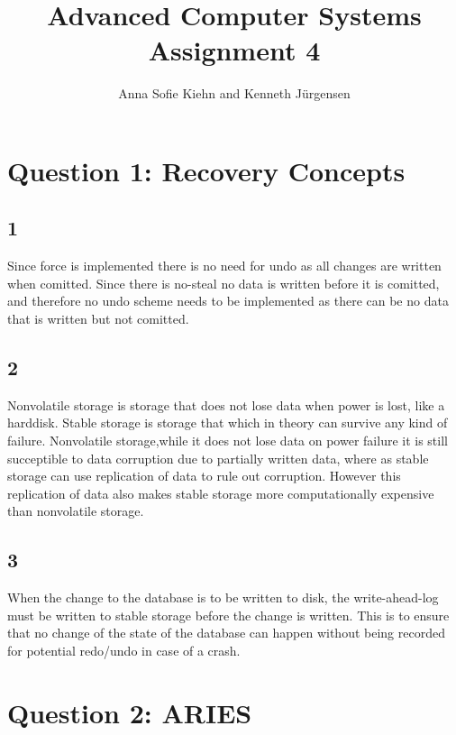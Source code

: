 \documentclass{article}
\theoremstyle{plain}
\theoremstyle{nonumberplain}
\begin{document}
\title{Advanced Computer Systems \\ Assignment 4}

\author{Anna Sofie Kiehn and Kenneth Jürgensen}

\maketitle

\section*{Question 1: Recovery Concepts}

\subsection*{1}
	Since force is implemented there is no need for undo as all changes are written when comitted. Since there is no-steal no data is written before it is comitted, and therefore no undo scheme needs to be implemented as there can be no data that is written but not comitted.

\subsection*{2}
	Nonvolatile storage is storage that does not lose data when power is lost, like a harddisk. Stable storage is storage that which in theory can survive any kind of failure. Nonvolatile storage,while it does not lose data on power failure it is still succeptible to data corruption due to partially written data, where as stable storage can use replication of data to rule out corruption. However this replication of data also makes stable storage more computationally expensive than nonvolatile storage.

\subsection*{3}
	When the change to the database is to be written to disk, the write-ahead-log must be written to stable storage before the change is written. This is to ensure that no change of the state of the database can happen without being recorded for potential redo/undo in case of a crash.

\section*{Question 2: ARIES}
\end{document}
